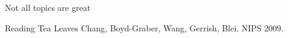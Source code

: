 \documentclass[compress]{beamer}
\begin{document}
\begin{frame}{Not all topics are great}

	\begin{center}
		
		\begin{block}{Reading Tea Leaves}
			Chang, Boyd-Graber, Wang, Gerrish, Blei.  NIPS 2009.
		\end{block}
	\end{center}
\end{frame}
\end{document}
